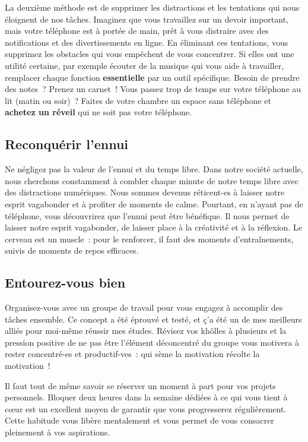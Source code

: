 \documentclass[a4paper, 12pt, garamond]{book}
\begin{document}
La deuxième méthode est de supprimer les distractions et les tentations qui nous
éloignent de nos tâches. Imaginez que vous travaillez sur un devoir important,
mais votre téléphone est à portée de main, prêt à vous distraire avec des
notifications et des divertissements en ligne. En éliminant ces tentations, vous
supprimez les obstacles qui vous empêchent de vous concentrer. Si elles ont une
utilité certaine, par exemple écouter de la musique qui vous aide à travailler,
remplacer chaque fonction \textbf{essentielle} par un outil spécifique. Besoin
de prendre des notes~? Prenez un carnet~! Vous passez trop de temps sur votre
téléphone au lit (matin ou soir)~? Faites de votre chambre un espace sans
téléphone et \textbf{achetez un réveil} qui ne soit pas votre téléphone.

\subsection{Reconquérir l'ennui}

Ne négligez pas la valeur de l'ennui et du temps libre. Dans notre société
actuelle, nous cherchons constamment à combler chaque minute de notre temps
libre avec des distractions numériques. Nous sommes devenus réticent-es à
laisser notre esprit vagabonder et à profiter de moments de calme. Pourtant, en
n'ayant pas de téléphone, vous découvrirez que l'ennui peut être bénéfique. Il
nous permet de laisser notre esprit vagabonder, de laisser place à la créativité
et à la réflexion. Le cerveau est un muscle~: pour le renforcer, il faut des
moments d'entraînements, suivis de moments de repos efficaces.

\subsection{Entourez-vous bien}

Organisez-vous avec un groupe de travail pour vous engagez à accomplir des
tâches ensemble. Ce concept a été éprouvé et testé, et ç'a été un de mes
meilleurs alliés pour moi-même réussir mes études. Révisez vos khôlles à
plusieurs et la pression positive de ne pas être l'élément déconcentré du groupe
vous motivera à rester concentré-es et productif-ves~: qui sème la motivation
récolte la motivation~!

Il faut tout de même savoir se réserver un moment à part pour vos projets
personnels. Bloquer deux heures dans la semaine dédiées à ce qui vous tient à
cœur est un excellent moyen de garantir que vous progresserez régulièrement.
Cette habitude vous libère mentalement et vous permet de vous consacrer
pleinement à vos aspirations.
\end{document}
